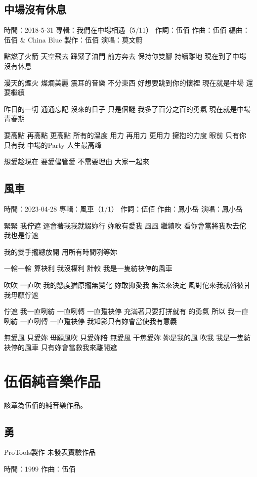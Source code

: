 \documentclass[UTF8,a4paper,oneside,twocolumn,12pt]{ctexbook}
\newcommand{\infopair}[2]{\textbullet #1：#2}
\newcommand{\zc}[1][伍佰]{\infopair{作詞}{#1}}
\newcommand{\zq}[1][伍佰]{\infopair{作曲}{#1}}
\newcommand{\bq}[1][伍佰]{\infopair{編曲}{#1}}
\newcommand{\zj}[1]{\infopair{專輯}{#1}}
\newcommand{\zz}[1]{\infopair{製作}{#1}}
\newcommand{\sj}[1]{\infopair{時間}{#1}}
\newenvironment{info}{\begin{flushleft}\kaishu
	}
	{\end{flushleft}\normalsize\yahei\par}
\newenvironment{lyric}{
	}
{}
\begin{document}
\section{中場沒有休息}
\begin{info}
	\sj{2018-5-31}
	\zj{我們在中場相遇（5/11）}
	\zc
	\zq
	\bq[伍佰 \& China Blue]
	\zz{伍佰}
	\infopair{演唱}{莫文蔚}
\end{info}
\begin{lyric}
	點燃了火箭 天空飛去
	踩緊了油門 前方奔去
	保持你雙腳 持續離地
	現在到了中場 沒有休息

	漫天的煙火 燦爛美麗
	震耳的音樂 不分東西
	好想要跳到你的懷裡
	現在就是中場 還要繼續

	昨日的一切 通通忘記
	沒來的日子 只是個謎
	我多了百分之百的勇氣
	現在就是中場青春期

	要高點 再高點 更高點 所有的溫度
	用力 再用力 更用力 擁抱的力度
	眼前 只有你 只有我 中場的Party
	人生最高峰

	想愛趁現在 要愛儘管愛
	不需要理由 大家一起來
\end{lyric}

\section{風車}
\begin{info}
	\sj{2023-04-28}
	\zj{風車（1/1）}
	\zc
	\zq[鳳小岳]
	\infopair{演唱}{鳳小岳}
\end{info}
\begin{lyric}
	緊緊 我佇遮
	逐會著我我就綴妳行
	妳敢有愛我
	風風 繼續吹
	看你會當將我吹去佗
	我也是佇遮

	我的雙手攏總放開
	用所有時間咧等妳

	一輪一輪 算袂利
	我沒權利 計較
	我是一隻紡袂停的風車

	吹吹 一直吹
	我的懸度猶原攏無變化
	妳敢抑愛我
	無法來決定
	風對佗來我就斡彼爿
	我毋願佇遮

	佇遮 我一直咧紡 一直咧轉 一直踅袂停
	充滿著只要打拼就有 的勇氣
	所以 我一直咧紡 一直咧轉 一直踅袂停
	我知影只有妳會當使我有意義

	無愛風 只愛妳 毋願風吹 只愛妳陪 無愛風 干焦愛妳 妳是我的風 吹我
	我是一隻紡袂停的風車 只有妳會當救我來離開遮
\end{lyric}

\chapter{伍佰純音樂作品}
該章為伍佰的純音樂作品。

\section{勇}
\begin{info}
	ProTools製作 未發表實驗作品

	\sj{1999}
	\zq
\end{info}
\end{document}
